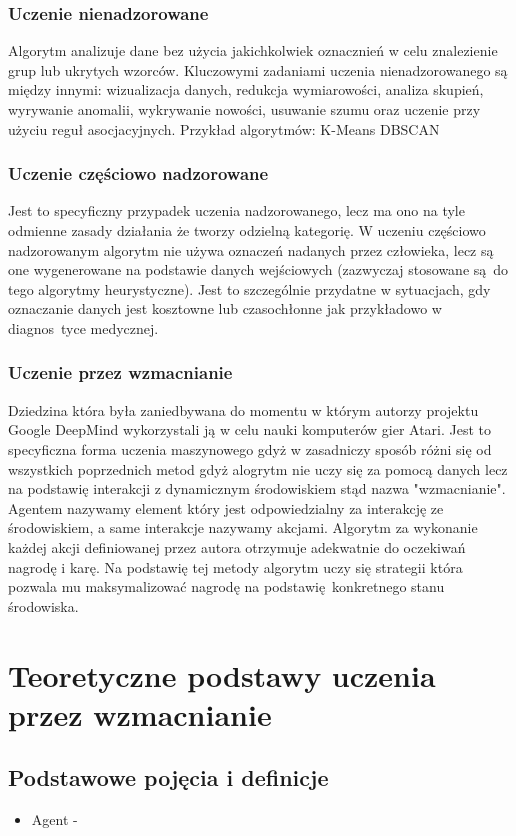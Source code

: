 \documentclass[a4paper, 10pt]{article}
\begin{document}
    \subsubsection{Uczenie nienadzorowane}
    Algorytm analizuje dane bez użycia jakichkolwiek oznacznień w celu znalezienie grup lub ukrytych wzorców.
    Kluczowymi zadaniami uczenia nienadzorowanego są między innymi: wizualizacja danych,
    redukcja wymiarowości, analiza skupień, wyrywanie anomalii, wykrywanie nowości, usuwanie szumu
    oraz uczenie przy użyciu reguł asocjacyjnych. Przykład algorytmów: K-Means DBSCAN

    \subsubsection{Uczenie częściowo nadzorowane}
    Jest to specyficzny przypadek uczenia nadzorowanego, lecz ma ono na tyle odmienne zasady działania że tworzy
    odzielną kategorię. W uczeniu częściowo nadzorowanym algorytm nie używa oznaczeń nadanych przez człowieka, lecz są one 
    wygenerowane na podstawie danych wejściowych (zazwyczaj stosowane są do tego algorytmy heurystyczne).
    Jest to szczególnie przydatne w sytuacjach, gdy oznaczanie danych jest kosztowne lub czasochłonne jak przykładowo
    w diagnos~tyce medycznej. 

    \subsubsection{Uczenie przez wzmacnianie}
    Dziedzina która była zaniedbywana do momentu w którym autorzy projektu Google DeepMind wykorzystali ją w celu nauki komputerów 
    gier Atari. Jest to specyficzna forma uczenia maszynowego gdyż w zasadniczy sposób różni się od wszystkich poprzednich metod gdyż
    alogrytm nie uczy się za pomocą danych lecz na podstawię interakcji z dynamicznym środowiskiem stąd nazwa "wzmacnianie". 
    Agentem nazywamy element który jest odpowiedzialny za interakcję ze środowiskiem, a same interakcje nazywamy akcjami.
    Algorytm za wykonanie każdej akcji definiowanej przez autora otrzymuje adekwatnie do oczekiwań nagrodę i karę. Na podstawię 
    tej metody algorytm uczy się strategii która pozwala mu maksymalizować nagrodę na podstawię konkretnego stanu środowiska.
    
    \section{Teoretyczne podstawy uczenia przez wzmacnianie}

    \subsection{Podstawowe pojęcia i definicje}
    \begin{itemize}
        \item Agent - 
    \end{itemize}
\end{document}
